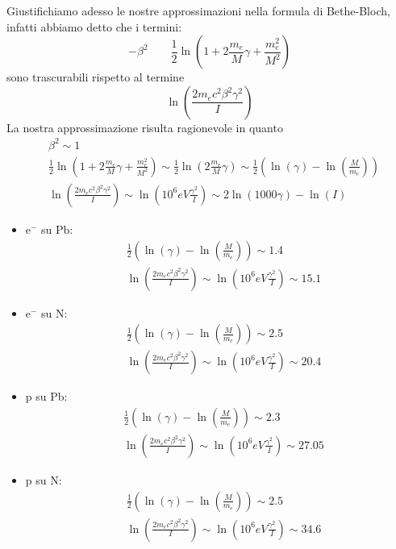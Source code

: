 \documentclass[twoside]{article}
\begin{document}
Giustifichiamo adesso le nostre approssimazioni nella formula di Bethe-Bloch, infatti abbiamo detto che i termini:
\begin{equation}
    -\beta^2\qquad \frac{1}{2}\ln(1+2\frac{m_e}{M}\gamma+\frac{m_e^2}{M^2}) 
\end{equation}
sono trascurabili rispetto al termine
\begin{equation}
    \ln(\frac{2m_ec^2\beta^2\gamma^2}{I})
\end{equation}
La nostra approssimazione risulta ragionevole in quanto\\
\begin{align}
    &\beta^2\sim1\\
    &\frac{1}{2}\ln(1+2\frac{m_e}{M}\gamma+\frac{m_e^2}{M^2})\sim\frac{1}{2}\ln(2\frac{m_e}{M}\gamma)\sim\frac{1}{2}\left(\ln(\gamma)-\ln(\frac{M}{m_e}) \right)\\
    &\ln(\frac{2m_ec^2\beta^2\gamma^2}{I})\sim\ln(10^6eV\frac{\gamma^2}{I})\sim2\ln(1000\gamma)-\ln(I)
\end{align}
\begin{itemize}
    \item e$^-$ su Pb:
    \begin{align}
        &\frac{1}{2}\left(\ln(\gamma)-\ln(\frac{M}{m_e}) \right)\sim 1.4\\
        &\ln(\frac{2m_ec^2\beta^2\gamma^2}{I})\sim\ln(10^6eV\frac{\gamma^2}{I})\sim 15.1
    \end{align}
    \item e$^-$ su N:
    \begin{align}
        &\frac{1}{2}\left(\ln(\gamma)-\ln(\frac{M}{m_e}) \right)\sim 2.5\\
        &\ln(\frac{2m_ec^2\beta^2\gamma^2}{I})\sim\ln(10^6eV\frac{\gamma^2}{I})\sim 20.4
    \end{align}
    \item p su Pb:
    \begin{align}
        &\frac{1}{2}\left(\ln(\gamma)-\ln(\frac{M}{m_e}) \right)\sim 2.3\\
        &\ln(\frac{2m_ec^2\beta^2\gamma^2}{I})\sim\ln(10^6eV\frac{\gamma^2}{I})\sim 27.05
    \end{align}
    \item p su N:
    \begin{align}
        &\frac{1}{2}\left(\ln(\gamma)-\ln(\frac{M}{m_e}) \right)\sim 2.5\\
        &\ln(\frac{2m_ec^2\beta^2\gamma^2}{I})\sim\ln(10^6eV\frac{\gamma^2}{I})\sim 34.6
    \end{align}
\end{itemize}
\end{document}
